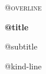 \vspace*{0.12\textheight}
{\large\scshape @{overline}\par}
\vspace{1.5em}
{\Huge\bfseries @{title}\par}
\vspace{0.9em}
{\Large @{subtitle}\par}
\vspace{1.2em}
{\large @{kind-line}\par}
\vfill
